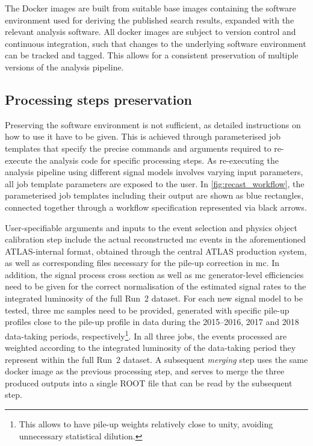 The Docker images are built from suitable base images containing the software environment used for deriving the published \onelepton search results, expanded with the relevant analysis software. All docker images are subject to version control and continuous integration, such that changes to the underlying software environment can be tracked and tagged. This allows for a consistent preservation of multiple versions of the analysis pipeline. 

\subsection{Processing steps preservation}

Preserving the software environment is not sufficient, as detailed instructions on how to use it have to be given. This is achieved through parameterised job templates that specify the precise commands and arguments required to re-execute the analysis code for specific processing steps. As re-executing the analysis pipeline using different signal models involves varying input parameters, all job template parameters are exposed to the user. In \cref{fig:recast_workflow}, the parameterised job templates including their output are shown as blue rectangles, connected together through a workflow specification represented via black arrows. 

User-specifiable arguments and inputs to the event selection and physics object calibration step include the actual reconstructed \gls{mc} events in the aforementioned ATLAS-internal format, obtained through the central ATLAS production system, as well as corresponding files necessary for the pile-up correction in \gls{mc}. 
In addition, the signal process cross section as well as \gls{mc} generator-level efficiencies need to be given for the correct normalisation of the estimated signal rates to the integrated luminosity of the full Run~2 dataset. 
For each new signal model to be tested, three \gls{mc} samples need to be provided, generated with specific pile-up profiles close to the pile-up profile in data during the 2015--2016, 2017 and 2018 data-taking periods, respectively\footnote{This allows to have pile-up weights relatively close to unity, avoiding unnecessary statistical dilution.}. 
In all three jobs, the events processed are weighted according to the integrated luminosity of the data-taking period they represent within the full Run~2 dataset. A subsequent \textit{merging} step uses the same docker image as the previous processing step, and serves to merge the three produced outputs into a single \textsc{ROOT} file that can be read by the subsequent step.

